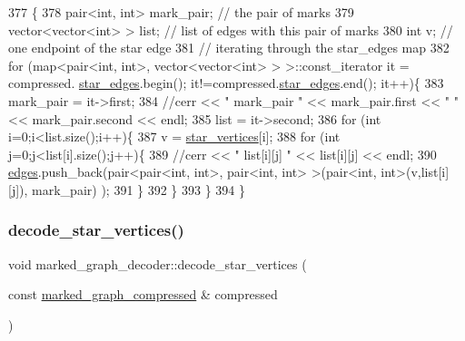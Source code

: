 \begin{DoxyCode}
377 \{
378   pair<int, int> mark\_pair; \textcolor{comment}{// the pair of marks}
379   vector<vector<int> > list; \textcolor{comment}{// list of edges with this pair of marks}
380   \textcolor{keywordtype}{int} v; \textcolor{comment}{// one endpoint of the star edge}
381   \textcolor{comment}{// iterating through the star\_edges map}
382   \textcolor{keywordflow}{for} (map<pair<int, int>, vector<vector<int> > >::const\_iterator it = compressed.
      \hyperlink{classmarked__graph__compressed_a7df5779d313486644132bd816937f532}{star\_edges}.begin(); it!=compressed.\hyperlink{classmarked__graph__compressed_a7df5779d313486644132bd816937f532}{star\_edges}.end(); it++)\{
383     mark\_pair = it->first;
384     \textcolor{comment}{//cerr << " mark\_pair " << mark\_pair.first << " " << mark\_pair.second << endl;}
385     list = it->second;
386     \textcolor{keywordflow}{for} (\textcolor{keywordtype}{int} i=0;i<list.size();i++)\{
387       v = \hyperlink{classmarked__graph__decoder_a06fc05827db14b675f7ecc2fd915b533}{star\_vertices}[i];
388       \textcolor{keywordflow}{for} (\textcolor{keywordtype}{int} j=0;j<list[i].size();j++)\{
389         \textcolor{comment}{//cerr << " list[i][j] " << list[i][j] << endl;}
390         \hyperlink{classmarked__graph__decoder_af9e75da0a495d9c3bdcd169e15e3261e}{edges}.push\_back(pair<pair<int, int>, pair<int, int> >(pair<int, int>(v,list[i][j]), mark\_pair)
      );
391       \}
392     \}
393   \}
394 \}
\end{DoxyCode}
\mbox{\label{classmarked__graph__decoder_a57fba34d119743414a38c7339b910d99}} 
\subsubsection{\texorpdfstring{decode\+\_\+star\+\_\+vertices()}{decode\_star\_vertices()}}
{\footnotesize\ttfamily void marked\+\_\+graph\+\_\+decoder\+::decode\+\_\+star\+\_\+vertices (\begin{DoxyParamCaption}\item[{const \hyperlink{classmarked__graph__compressed}{marked\+\_\+graph\+\_\+compressed} \&}]{compressed }\end{DoxyParamCaption})\hspace{0.3cm}{\ttfamily [private]}}


